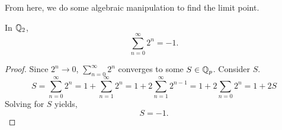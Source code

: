 \documentclass[notitlepage]{problem-solving}
\begin{document}
From here, we do some algebraic manipulation to find the limit point.

\begin{proposition}
	In $\mathbb{Q}_2$,
	\[
		\sum_{n=0}^\infty 2^n = -1.
	\]
\end{proposition}
\begin{proof}
	Since $2^n\rightarrow 0$, $\sum_{n=0}^\infty 2^n$ converges to some $S\in\mathbb{Q}_p$.
	Consider $S$.
	\[
		S= \sum_{n=0}^\infty 2^n = 1 + \sum_{n=1}^\infty 2^n = 1+ 2\sum_{n=1}^\infty 2^{n-1} = 1+ 2 \sum_{n=0} 2^n = 1+ 2S
	\]
	Solving for $S$ yields,
	\[
		S = -1.
	\]
\end{proof}

\printbibliography
\end{document}
